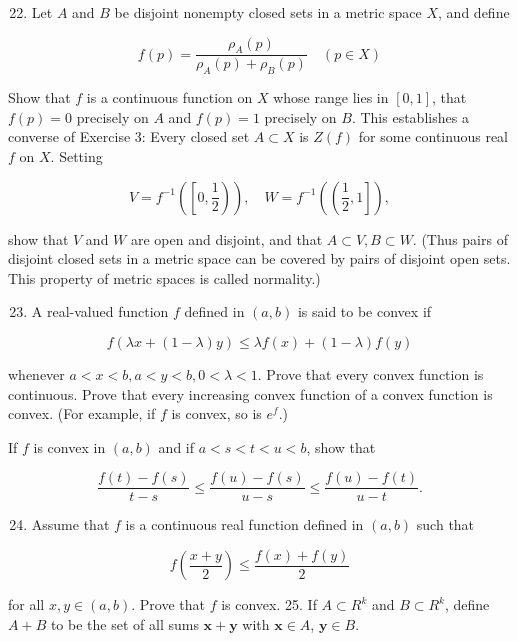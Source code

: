 \documentclass[10pt]{article}
\begin{document}
\begin{enumerate}
  \setcounter{enumi}{21}
  \item Let $A$ and $B$ be disjoint nonempty closed sets in a metric space $X$, and define
\end{enumerate}

$$
f(p)=\frac{\rho_{A}(p)}{\rho_{A}(p)+\rho_{B}(p)} \quad(p \in X)
$$

Show that $f$ is a continuous function on $X$ whose range lies in $[0,1]$, that $f(p)=0$ precisely on $A$ and $f(p)=1$ precisely on $B$. This establishes a converse of Exercise 3: Every closed set $A \subset X$ is $Z(f)$ for some continuous real $f$ on $X$. Setting

$$
V=f^{-1}\left(\left[0, \frac{1}{2}\right)\right), \quad W=f^{-1}\left(\left(\frac{1}{2}, 1\right]\right),
$$

show that $V$ and $W$ are open and disjoint, and that $A \subset V, B \subset W$. (Thus pairs of disjoint closed sets in a metric space can be covered by pairs of disjoint open sets. This property of metric spaces is called normality.)

\begin{enumerate}
  \setcounter{enumi}{22}
  \item A real-valued function $f$ defined in $(a, b)$ is said to be convex if
\end{enumerate}

$$
f(\lambda x+(1-\lambda) y) \leq \lambda f(x)+(1-\lambda) f(y)
$$

whenever $a<x<b, a<y<b, 0<\lambda<1$. Prove that every convex function is continuous. Prove that every increasing convex function of a convex function is convex. (For example, if $f$ is convex, so is $e^{f}$.)

If $f$ is convex in $(a, b)$ and if $a<s<t<u<b$, show that

$$
\frac{f(t)-f(s)}{t-s} \leq \frac{f(u)-f(s)}{u-s} \leq \frac{f(u)-f(t)}{u-t} .
$$

\begin{enumerate}
  \setcounter{enumi}{23}
  \item Assume that $f$ is a continuous real function defined in $(a, b)$ such that
\end{enumerate}

$$
f\left(\frac{x+y}{2}\right) \leq \frac{f(x)+f(y)}{2}
$$

for all $x, y \in(a, b)$. Prove that $f$ is convex. 25. If $A \subset R^{k}$ and $B \subset R^{k}$, define $A+B$ to be the set of all sums $\mathbf{x}+\mathbf{y}$ with $\mathbf{x} \in A$, $\mathbf{y} \in B$.
\end{document}
